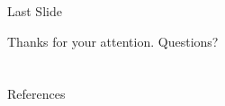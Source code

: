 \begin{frame}{Last Slide}

{\centering

Thanks for your attention. Questions?

}

\end{frame}

\section*{}

\begin{frame}[allowframebreaks]{References}
\footnotesize


\end{frame}






